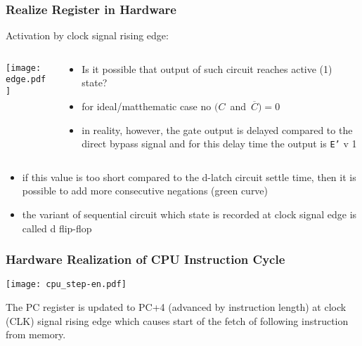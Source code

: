 \documentclass{beamer}
\begin{document}
\begin{frame}
\frametitle{Realize Register in Hardware}

Activation by clock signal rising edge:
\begin{columns}
\begin{column}{0.45\textwidth}
\begin{center}
\texttt{[image: edge.pdf]}
\end{center}
\end{column}
\begin{column}{0.55\textwidth}
\begin{itemize}
\item Is it possible that output of such circuit reaches active (1) state?
\item for ideal/matthematic case no $(C$~and~$\overline{C})=0$
\item in reality, however, the gate output is delayed compared to the direct bypass signal and for this delay time the output is \texttt{E'} v 1
\end{itemize}
\end{column}
\end{columns}
\bigskip
\begin{itemize}
\item if this value is too short compared to the d-latch circuit settle time, then it is possible to add more consecutive negations (green curve)
\item the variant of sequential circuit which state is recorded at clock signal edge is called d flip-flop
\end{itemize}

\end{frame}


\begin{frame}
\frametitle{Hardware Realization of CPU Instruction Cycle}

\begin{center}
\texttt{[image: cpu\_step-en.pdf]}
\end{center}

The PC register is updated to PC+4 (advanced by instruction length) at clock (CLK) signal rising edge which causes start of the fetch of following instruction from memory.
\end{frame}
\end{document}

